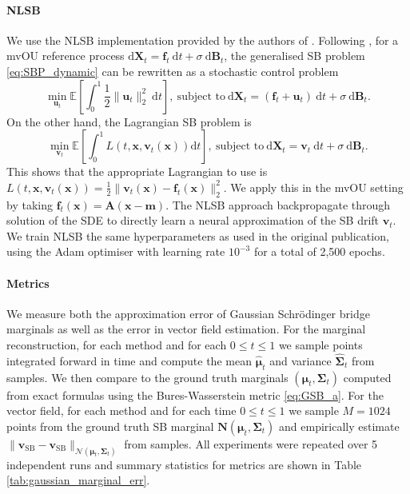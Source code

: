 \documentclass{article}
\newcommand{\diff}{\mathrm{d}}
\newcommand{\E}{\mathbb{E}}
\newcommand{\Nc}{\mathcal{N}}
\theoremstyle{newstyle}
\begin{document}
\paragraph{NLSB} We use the NLSB implementation provided by the authors of \cite{koshizuka2022neural}. Following \cite[Section 4.6]{chen2021stochastic}, for a mvOU reference process $\diff \bm{X}_t = \bm{f}_t \: \diff t + \sigma \: \diff \bm{B}_t$, the generalised SB problem \eqref{eq:SBP_dynamic} can be rewritten as a stochastic control problem
\[
  \min_{\bm{u}_t} \E\left[ \int_0^1 \frac{1}{2} \| \bm{u}_t \|_2^2 \: \diff t \right], \: \text{subject to} \: \diff \bm{X}_t = (\bm{f}_t + \bm{u}_t) \: \diff t + \sigma \: \diff \bm{B}_t. 
\]
On the other hand, the Lagrangian SB problem \cite[Definition 3.1]{koshizuka2022neural} is
\[
  \min_{\bm{v}_t} \E \left[ \int_0^1 L(t, \bm{x}, \bm{v}_t(\bm{x})) \diff t \right], \: \text{subject to} \: \diff \bm{X}_t = \bm{v}_t \: \diff t + \sigma \: \diff \bm{B}_t. 
\]
This shows that the appropriate Lagrangian to use is $L(t, \bm{x}, \bm{v}_t(\bm{x})) = \frac{1}{2} \| \bm{v}_t(\bm{x}) - \bm{f}_t(\bm{x})\|_2^2$. We apply this in the mvOU setting by taking $\bm{f}_t(\bm{x}) = \bm{A}(\bm{x} - \bm{m})$. The NLSB approach backpropagate through solution of the SDE to directly learn a neural approximation of the SB drift $\bm{v}_t$.
We train NLSB the same hyperparameters as used in the original publication, using the Adam optimiser with learning rate $10^{-3}$ for a total of 2,500 epochs. 

\paragraph{Metrics}

We measure both the approximation error of Gaussian Schr\"odinger bridge marginals as well as the error in vector field estimation. For the marginal reconstruction, for each method and for each $0 \leq t \leq 1$ we sample points integrated forward in time and compute the mean $\hat{\bm{\mu}}_t$ and variance $\hat{\bm{\Sigma}}_t$ from samples. We then compare to the ground truth marginals $(\bm{\mu}_t, \bm{\Sigma}_t)$  computed from exact formulas using the Bures-Wasserstein metric \eqref{eq:GSB_a}. For the vector field, for each method and for each time $0 \leq t \leq 1$ we sample $M = 1024$ points from the ground truth SB marginal $\bm{N}(\bm{\mu}_t, \bm{\Sigma}_t)$ and empirically estimate $\| \hat{\bm{v}}_{\mathrm{SB}} - \bm{v}_{\mathrm{SB}} \|_{\Nc(\bm{\mu}_t, \bm{\Sigma}_t)}$ from samples. All experiments were repeated over 5 independent runs and summary statistics for metrics are shown in Table \ref{tab:gaussian_marginal_err}. 
\end{document}
